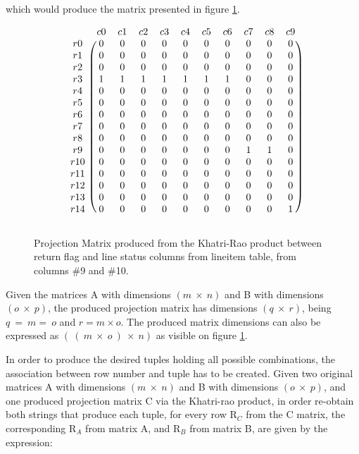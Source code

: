 which would produce the matrix presented in figure \ref{fig:example_matrix_krao}.
  
\begin{figure}[H]
\centering
\caption{Projection Matrix produced from the Khatri-Rao product between return flag and line status columns from lineitem table, from columns \#9 and \#10.}
\[
\begin{blockarray}{ccccccccccc}
		& c	0	& c	1	& c	2	& c	3	& c	4	& c	5	& c	6	& c	7	& c	8	& c	9	\\
\begin{block}{c(cccccccccc)}
r	0	&	0	&	0	&	0	&	0	&	0	&	0	&	0	&	0	&	0	&	0	\\
r	1	&	0	&	0	&	0	&	0	&	0	&	0	&	0	&	0	&	0	&	0	\\
r	2	&	0	&	0	&	0	&	0	&	0	&	0	&	0	&	0	&	0	&	0	\\
r	3	&	1	&	1	&	1	&	1	&	1	&	1	&	1	&	0	&	0	&	0	\\
r	4	&	0	&	0	&	0	&	0	&	0	&	0	&	0	&	0	&	0	&	0	\\
r	5	&	0	&	0	&	0	&	0	&	0	&	0	&	0	&	0	&	0	&	0	\\
r	6	&	0	&	0	&	0	&	0	&	0	&	0	&	0	&	0	&	0	&	0	\\
r	7	&	0	&	0	&	0	&	0	&	0	&	0	&	0	&	0	&	0	&	0	\\
r	8	&	0	&	0	&	0	&	0	&	0	&	0	&	0	&	0	&	0	&	0	\\
r	9	&	0	&	0	&	0	&	0	&	0	&	0	&	0	&	1	&	1	&	0	\\
r	10	&	0	&	0	&	0	&	0	&	0	&	0	&	0	&	0	&	0	&	0	\\
r	11	&	0	&	0	&	0	&	0	&	0	&	0	&	0	&	0	&	0	&	0	\\
r	12	&	0	&	0	&	0	&	0	&	0	&	0	&	0	&	0	&	0	&	0	\\
r	13	&	0	&	0	&	0	&	0	&	0	&	0	&	0	&	0	&	0	&	0	\\
r	14	&	0	&	0	&	0	&	0	&	0	&	0	&	0	&	0	&	0	&	1	\\
\end{block}
\end{blockarray}
\]
\label{fig:example_matrix_krao}
\end{figure}

Given the matrices A with dimensions $(m\ \times\ n)$ and B with dimensions $(o\ \times\ p)$, the produced projection matrix has dimensions $(q\ \times\ r)$, being $q\ =\ m =\ o$ and $r = m \times o$. The produced matrix dimensions can also be expressed as $(\ (\ m\ \times\ o\ )\ \times\ n)$ as visible on figure \ref{fig:example_matrix_krao}.\par
In order to produce the desired tuples  holding all possible combinations, the association between row number and tuple has to be created. Given two original matrices A with dimensions $(m\ \times\ n)$ and B with dimensions $(o\ \times\ p)$, and one produced projection matrix C via the Khatri-rao product, in order re-obtain both strings that produce each tuple, for every row R$_{C}$ from the C matrix, the corresponding R$_{A}$ from matrix A, and R$_{B}$ from matrix B, are given by the expression: 


